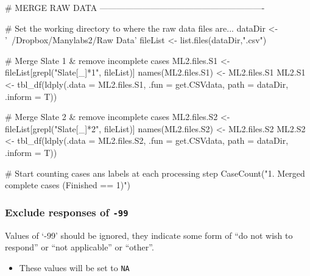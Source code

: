 \documentclass[]{article}
\newenvironment{Shaded}{\begin{snugshade}}{\end{snugshade}}
\newcommand{\KeywordTok}[1]{\textcolor[rgb]{0.94,0.87,0.69}{{#1}}}
\newcommand{\DataTypeTok}[1]{\textcolor[rgb]{0.87,0.87,0.75}{{#1}}}
\newcommand{\StringTok}[1]{\textcolor[rgb]{0.80,0.58,0.58}{{#1}}}
\newcommand{\CommentTok}[1]{\textcolor[rgb]{0.50,0.62,0.50}{{#1}}}
\newcommand{\NormalTok}[1]{\textcolor[rgb]{0.80,0.80,0.80}{{#1}}}
\begin{document}
\begin{Shaded}
\begin{Highlighting}[]
\CommentTok{# MERGE RAW DATA ----------------------------------------------------------}

\CommentTok{# Set the working directory to where the raw data files are...}
\NormalTok{dataDir  <-}\StringTok{ '~/Dropbox/Manylabs2/Raw Data'}
\NormalTok{fileList <-}\StringTok{ }\KeywordTok{list.files}\NormalTok{(dataDir,}\StringTok{".csv"}\NormalTok{)}

\CommentTok{# Merge Slate 1 & remove incomplete cases}
\NormalTok{ML2.files.S1 <-}\StringTok{ }\NormalTok{fileList[}\KeywordTok{grepl}\NormalTok{(}\StringTok{"Slate[_]*1"}\NormalTok{, fileList)]}
\KeywordTok{names}\NormalTok{(ML2.files.S1) <-}\StringTok{ }\NormalTok{ML2.files.S1}
\NormalTok{ML2.S1 <-}\StringTok{ }\KeywordTok{tbl_df}\NormalTok{(}\KeywordTok{ldply}\NormalTok{(}\DataTypeTok{.data =} \NormalTok{ML2.files.S1, }\DataTypeTok{.fun =} \NormalTok{get.CSVdata, }\DataTypeTok{path =} \NormalTok{dataDir, }\DataTypeTok{.inform =} \NormalTok{T))}

\CommentTok{# Merge Slate 2 & remove incomplete cases}
\NormalTok{ML2.files.S2 <-}\StringTok{ }\NormalTok{fileList[}\KeywordTok{grepl}\NormalTok{(}\StringTok{"Slate[_]*2"}\NormalTok{, fileList)]}
\KeywordTok{names}\NormalTok{(ML2.files.S2) <-}\StringTok{ }\NormalTok{ML2.files.S2}
\NormalTok{ML2.S2 <-}\StringTok{ }\KeywordTok{tbl_df}\NormalTok{(}\KeywordTok{ldply}\NormalTok{(}\DataTypeTok{.data =} \NormalTok{ML2.files.S2, }\DataTypeTok{.fun =} \NormalTok{get.CSVdata, }\DataTypeTok{path =} \NormalTok{dataDir, }\DataTypeTok{.inform =} \NormalTok{T))}

\CommentTok{# Start counting cases ans labels at each processing step}
\KeywordTok{CaseCount}\NormalTok{(}\StringTok{"1. Merged complete cases (Finished == 1)"}\NormalTok{)}
\end{Highlighting}
\end{Shaded}

\subsubsection{\textbf{Exclude} responses of
\texttt{-99}}\label{exclude-responses-of--99}

Values of `-99' should be ignored, they indicate some form of ``do not
wish to respond'' or ``not applicable'' or ``other''.

\begin{itemize}
\itemsep1pt\parskip0pt
\item
  These values will be set to \texttt{NA}
\end{itemize}
\end{document}
